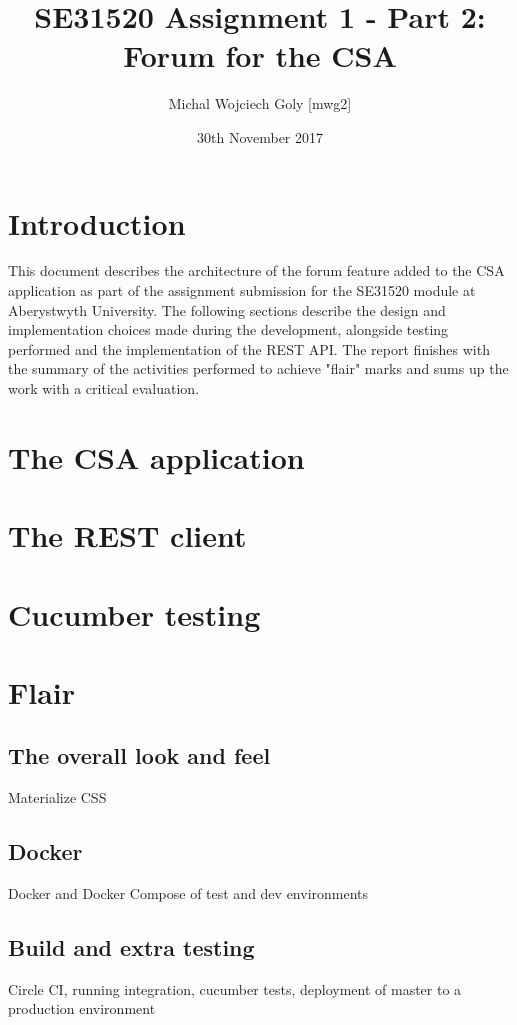 \documentclass[a4paper, 11pt, titlepage]{article}
\title{SE31520 Assignment 1 - Part 2: Forum for the CSA}
\author{Michal Wojciech Goly [mwg2]}
\date{30th November 2017}
\begin{document}
\maketitle
\tableofcontents
\newpage

\section{Introduction}
This document describes the architecture of the forum feature added to the CSA application
as part of the assignment submission for the SE31520 module at Aberystwyth University. The
following sections describe the design and implementation choices made during the development,
alongside testing performed and the implementation of the REST API. The report finishes with
the summary of the activities performed to achieve "flair" marks and sums up the work with
a critical evaluation.

\section{The CSA application}

\section{The REST client}

\section{Cucumber testing}

\section{Flair}
\subsection{The overall look and feel}
Materialize CSS

\subsection{Docker}
Docker and Docker Compose of test and dev environments

\subsection{Build and extra testing}
Circle CI, running integration, cucumber tests, deployment of master to a production environment
\end{document}
